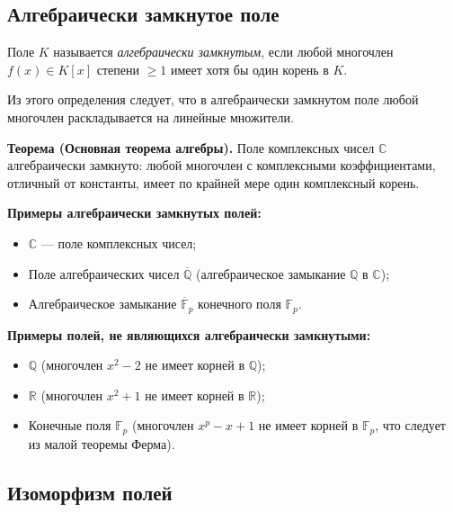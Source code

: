 \documentclass[a4paper,12pt]{article}
\theoremstyle{definition}
\theoremstyle{plain}
\theoremstyle{remark}
\begin{document}
	\subsection{Алгебраически замкнутое поле}
	
	\begin{tcolorbox}[colback=green!5, colframe=green!50!black, title=Определение]
		Поле \( K \) называется \textit{алгебраически замкнутым}, если любой многочлен \( f(x) \in K[x] \) степени \( \geq 1 \) имеет хотя бы один корень в \( K \).
	\end{tcolorbox}
	
	Из этого определения следует, что в алгебраически замкнутом поле любой многочлен раскладывается на линейные множители.
	
	\medskip
	\noindent \textbf{Теорема (Основная теорема алгебры).}
	Поле комплексных чисел \( \mathbb{C} \) алгебраически замкнуто: любой многочлен с комплексными коэффициентами, отличный от константы, имеет по крайней мере один комплексный корень.
	
	\medskip
	\noindent \textbf{Примеры алгебраически замкнутых полей:}
	\begin{itemize}
		\item \( \mathbb{C} \) — поле комплексных чисел;
		\item Поле алгебраических чисел \( \overline{\mathbb{Q}} \) (алгебраическое замыкание \( \mathbb{Q} \) в \( \mathbb{C} \));
		\item Алгебраическое замыкание \( \overline{\mathbb{F}}_p \) конечного поля \( \mathbb{F}_p \).
	\end{itemize}
	
	\medskip
	\noindent \textbf{Примеры полей, не являющихся алгебраически замкнутыми:}
	\begin{itemize}
		\item \( \mathbb{Q} \) (многочлен \( x^2 - 2 \) не имеет корней в \( \mathbb{Q} \));
		\item \( \mathbb{R} \) (многочлен \( x^2 + 1 \) не имеет корней в \( \mathbb{R} \));
		\item Конечные поля \( \mathbb{F}_p \) (многочлен \( x^p - x + 1 \) не имеет корней в \( \mathbb{F}_p \), что следует из малой теоремы Ферма).
	\end{itemize}
	
	\subsection{Изоморфизм полей}
	
\end{document}
